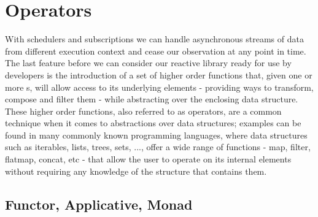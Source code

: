 

\section{Operators}
\label{operators}




With schedulers and subscriptions we can handle asynchronous streams of data from different execution context and cease our observation at any point in time. The last feature before we can consider our reactive library ready for use by developers is the introduction of a set of higher order functions that, given one or more s, will allow access to its underlying elements - providing ways to transform, compose and filter them - while abstracting over the enclosing data structure. These higher order functions, also referred to as operators, are a common technique when it comes to abstractions over data structures; examples can be found in many commonly known programming languages, where data structures such as iterables, lists, trees, sets, ..., offer a wide range of functions - map, filter, flatmap, concat, etc - that allow the user to operate on its internal elements without requiring any knowledge of the structure that contains them.

\subsection{Functor, Applicative, Monad}

